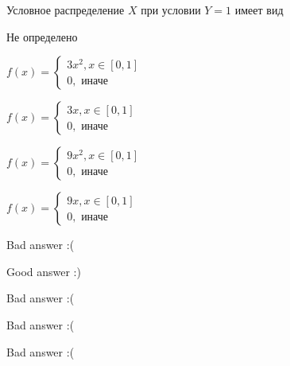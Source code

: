 
\begin{question}
Условное распределение \(X\) при условии \(Y=1\) имеет вид
\begin{answerlist}
  \item Не определено
  \item \(f(x) = \begin{cases} 3 x^2 , x \in [0,1] \\ 0,\text{ иначе} \end{cases}\)
  \item \(f(x) = \begin{cases} 3 x , x \in [0,1] \\ 0,\text{ иначе} \end{cases}\)
  \item \(f(x) = \begin{cases} 9 x^2 , x \in [0,1] \\ 0,\text{ иначе} \end{cases}\)
  \item \(f(x) = \begin{cases} 9 x , x \in [0,1] \\ 0,\text{ иначе} \end{cases}\)
\end{answerlist}
\end{question}

\begin{solution}
\begin{answerlist}
  \item Bad answer :(
  \item Good answer :)
  \item Bad answer :(
  \item Bad answer :(
  \item Bad answer :(
\end{answerlist}
\end{solution}

